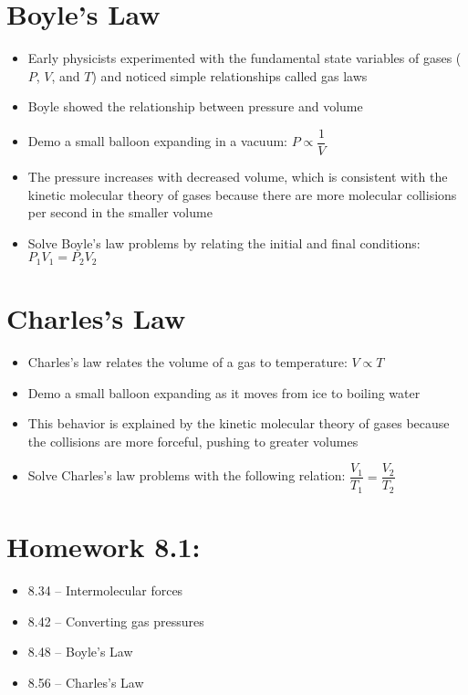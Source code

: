 \documentclass[12pt, openany, letterpaper]{memoir}
\begin{document}
\section{Boyle's Law}
\begin{itemize}
	\item Early physicists experimented with the fundamental state variables of gases ($P$, $V$, and $T$) and noticed simple relationships called gas laws
	\item Boyle showed the relationship between pressure and volume
	\item Demo a small balloon expanding in a vacuum: $P\propto \dfrac{1}{V}$
	\item The pressure increases with decreased volume, which is consistent with the kinetic molecular theory of gases because there are more molecular collisions per second in the smaller volume
	\item Solve Boyle's law problems by relating the initial and final conditions: $P_1V_1=P_2V_2$
\end{itemize}

\section{Charles's Law}
\begin{itemize}
	\item Charles's law relates the volume of a gas to temperature: $V\propto T$
	\item Demo a small balloon expanding as it moves from ice to boiling water
	\item This behavior is explained by the kinetic molecular theory of gases because the collisions are more forceful, pushing to greater volumes
	\item Solve Charles's law problems with the following relation: $\dfrac{V_1}{T_1}=\dfrac{V_2}{T_2}$
\end{itemize}

\section*{Homework 8.1:}
\begin{itemize}
  \item 8.34 -- Intermolecular forces
  \item 8.42 -- Converting gas pressures
  \item 8.48 -- Boyle's Law
  \item 8.56 -- Charles's Law
\end{itemize}
\end{document}
